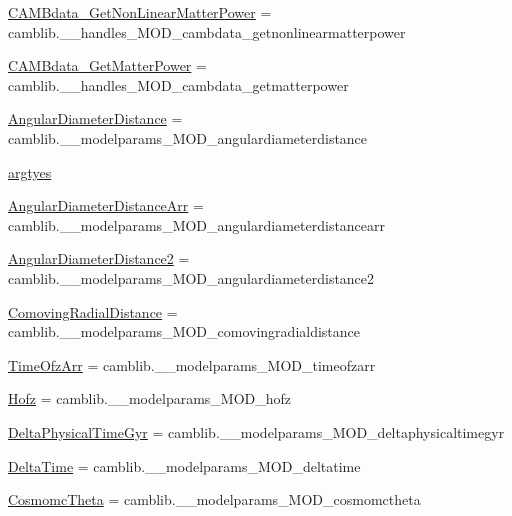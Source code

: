 \begin{DoxyCompactItemize}
\item 
\mbox{\hyperlink{namespacecamb_1_1camb_a04fbbbbce39ff55d403fcd8494fd0cc1}{C\+A\+M\+Bdata\+\_\+\+Get\+Non\+Linear\+Matter\+Power}} = camblib.\+\_\+\+\_\+handles\+\_\+\+M\+O\+D\+\_\+cambdata\+\_\+getnonlinearmatterpower
\item 
\mbox{\hyperlink{namespacecamb_1_1camb_a6c6612d982dd6455879101c1e6752736}{C\+A\+M\+Bdata\+\_\+\+Get\+Matter\+Power}} = camblib.\+\_\+\+\_\+handles\+\_\+\+M\+O\+D\+\_\+cambdata\+\_\+getmatterpower
\item 
\mbox{\hyperlink{namespacecamb_1_1camb_a4089502e6db5671063cf1e4d22cebd3c}{Angular\+Diameter\+Distance}} = camblib.\+\_\+\+\_\+modelparams\+\_\+\+M\+O\+D\+\_\+angulardiameterdistance
\item 
\mbox{\hyperlink{namespacecamb_1_1camb_a38b17660129624fb7bbbbee57c1a6b6c}{argtyes}}
\item 
\mbox{\hyperlink{namespacecamb_1_1camb_a8e8fd82e8855eca13007a51b88d44efd}{Angular\+Diameter\+Distance\+Arr}} = camblib.\+\_\+\+\_\+modelparams\+\_\+\+M\+O\+D\+\_\+angulardiameterdistancearr
\item 
\mbox{\hyperlink{namespacecamb_1_1camb_a28ac341c9b0c5ad2bb723636dc20d4b5}{Angular\+Diameter\+Distance2}} = camblib.\+\_\+\+\_\+modelparams\+\_\+\+M\+O\+D\+\_\+angulardiameterdistance2
\item 
\mbox{\hyperlink{namespacecamb_1_1camb_abea45cf46d041a2594299ddef0e2fee2}{Comoving\+Radial\+Distance}} = camblib.\+\_\+\+\_\+modelparams\+\_\+\+M\+O\+D\+\_\+comovingradialdistance
\item 
\mbox{\hyperlink{namespacecamb_1_1camb_a03f52f2e7698d22d7b202f45ef067413}{Time\+Ofz\+Arr}} = camblib.\+\_\+\+\_\+modelparams\+\_\+\+M\+O\+D\+\_\+timeofzarr
\item 
\mbox{\hyperlink{namespacecamb_1_1camb_a9062190a9faad2f801c6ef81b9143ae4}{Hofz}} = camblib.\+\_\+\+\_\+modelparams\+\_\+\+M\+O\+D\+\_\+hofz
\item 
\mbox{\hyperlink{namespacecamb_1_1camb_a0d78e19381b7a6fb313de6fccfe2821a}{Delta\+Physical\+Time\+Gyr}} = camblib.\+\_\+\+\_\+modelparams\+\_\+\+M\+O\+D\+\_\+deltaphysicaltimegyr
\item 
\mbox{\hyperlink{namespacecamb_1_1camb_a66e26cbf3357d7c21808dc7af9d2f01f}{Delta\+Time}} = camblib.\+\_\+\+\_\+modelparams\+\_\+\+M\+O\+D\+\_\+deltatime
\item 
\mbox{\hyperlink{namespacecamb_1_1camb_a4fe51e1298e6523912383946cb843e5a}{Cosmomc\+Theta}} = camblib.\+\_\+\+\_\+modelparams\+\_\+\+M\+O\+D\+\_\+cosmomctheta
\item 

\end{DoxyCompactItemize}
